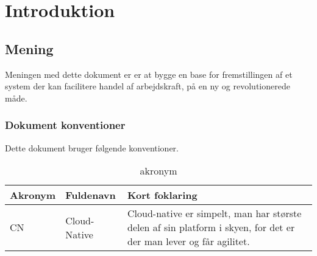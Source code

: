 \chapter{Introduktion}

\section{Mening}

Meningen med dette dokument er er at bygge en base for fremstillingen af et system der kan facilitere handel af arbejdskraft, på en ny og revolutionerede måde.

\subsection{Dokument konventioner}

Dette dokument bruger følgende konventioner.

\begin{table}[H]
    \begin{small}
        \caption{akronym}
        \label{tab:acronym}
        \begin{center}
            \begin{tabular}{l|l|p{10cm}}
                \textbf{Akronym} & \textbf{Fuldenavn} & \textbf{Kort foklaring}                                                                                           \\
                \hline
                CN               & Cloud-Native       & Cloud-native er simpelt, man har største delen af sin platform i skyen, for det er der man lever og får agilitet. \\
            \end{tabular}
        \end{center}
    \end{small}
\end{table}



